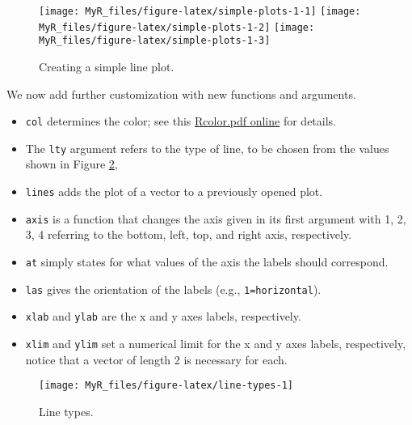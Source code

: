 \documentclass[]{book}
\providecommand{\tightlist}{%
  \setlength{\itemsep}{0pt}\setlength{\parskip}{0pt}}
\theoremstyle{definition}
\theoremstyle{definition}
\theoremstyle{definition}
\theoremstyle{remark}
\begin{document}
\begin{figure}

{\centering \texttt{[image: MyR\_files/figure-latex/simple-plots-1-1]} \texttt{[image: MyR\_files/figure-latex/simple-plots-1-2]} \texttt{[image: MyR\_files/figure-latex/simple-plots-1-3]} 

}

\caption{Creating a simple line plot.}\label{fig:simple-plots-1}
\end{figure}

We now add further customization with new functions and arguments.

\begin{itemize}
\tightlist
\item
  \texttt{col} determines the color; see this
  \href{http://www.stat.columbia.edu/~tzheng/files/Rcolor.pdf}{Rcolor.pdf
  online} for details.
\item
  The \texttt{lty} argument refers to the type of line, to be chosen
  from the values shown in Figure \ref{fig:line-types},
\item
  \texttt{lines} adds the plot of a vector to a previously opened plot.
\item
  \texttt{axis} is a function that changes the axis given in its first
  argument with 1, 2, 3, 4 referring to the bottom, left, top, and right
  axis, respectively.
\item
  \texttt{at} simply states for what values of the axis the labels
  should correspond.
\item
  \texttt{las} gives the orientation of the labels (e.g.,
  \texttt{1=horizontal}).
\item
  \texttt{xlab} and \texttt{ylab} are the x and y axes labels,
  respectively.
\item
  \texttt{xlim} and \texttt{ylim} set a numerical limit for the x and y
  axes labels, respectively, notice that a vector of length 2 is
  necessary for each.
\end{itemize}

\begin{figure}

{\centering \texttt{[image: MyR\_files/figure-latex/line-types-1]} 

}

\caption{Line types.}\label{fig:line-types}
\end{figure}
\end{document}
